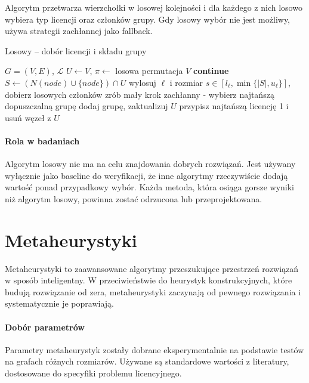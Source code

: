 Algorytm przetwarza wierzchołki w losowej kolejności i dla każdego z nich losowo wybiera typ licencji oraz członków grupy. Gdy losowy wybór nie jest możliwy, używa strategii zachłannej jako fallback.

\begin{algorithm}[H]
\caption{Losowy -- dobór licencji i składu grupy}
\label{alg:randomized}
\begin{algorithmic}[1]
\Require $G=(V,E)$, $\mathcal{L}$
\State $U\gets V$, $\pi\gets$ losowa permutacja $V$
   \textbf{continue}\EndIf
  \State $S\gets(N(node)\cup\{node\})\cap U$
    \State wylosuj $\ell$ i rozmiar $s\in[l_\ell,\min\{|S|,u_\ell\}]$, dobierz losowych członków
  \Else
    \State zrób mały krok zachłanny - wybierz najtańszą dopuszczalną grupę
  \EndIf
  \State dodaj grupę, zaktualizuj $U$
\EndFor
{} przypisz najtańszą licencję 1 i usuń węzeł z $U$ \EndWhile
\end{algorithmic}
\end{algorithm}

\paragraph{Rola w badaniach}
Algorytm losowy nie ma na celu znajdowania dobrych rozwiązań. Jest używany wyłącznie jako baseline do weryfikacji, że inne algorytmy rzeczywiście dodają wartość ponad przypadkowy wybór. Każda metoda, która osiąga gorsze wyniki niż algorytm losowy, powinna zostać odrzucona lub przeprojektowana.

\section{Metaheurystyki}

Metaheurystyki to zaawansowane algorytmy przeszukujące przestrzeń rozwiązań w sposób inteligentny. W przeciwieństwie do heurystyk konstrukcyjnych, które budują rozwiązanie od zera, metaheurystyki zaczynają od pewnego rozwiązania i systematycznie je poprawiają.

\paragraph{Dobór parametrów}
Parametry metaheurystyk zostały dobrane eksperymentalnie na podstawie testów na grafach różnych rozmiarów. Używane są standardowe wartości z literatury, dostosowane do specyfiki problemu licencyjnego.

